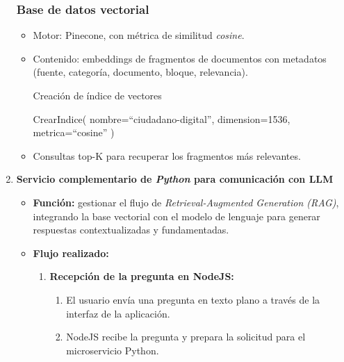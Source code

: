 \begin{enumerate}
            \subsubsection{Base de datos vectorial}
            \begin{itemize}
                  \item Motor: Pinecone, con métrica de similitud \textit{cosine}.
                  \item Contenido: embeddings de fragmentos de documentos con metadatos (fuente,
                        categoría, documento, bloque, relevancia).
                        \begin{algorithm}[H]
                              \caption{Creación de índice de vectores}
                              \label{alg:crear-indice}
                              \begin{algorithmic}[1]
                                    \State CrearIndice(
                                    \Statex \quad nombre=``ciudadano-digital'',
                                    \Statex \quad dimension=1536,
                                    \Statex \quad metrica=``cosine''
                                    \Statex )
                                    \EndProcedure
                              \end{algorithmic}
                        \end{algorithm}
                  \item Consultas top-K para recuperar los fragmentos más relevantes.
            \end{itemize}

      \item \textbf{Servicio complementario de \textit{Python} para comunicación con LLM}
            \begin{itemize}
                  \item \textbf{Función:} gestionar el flujo de \textit{Retrieval-Augmented Generation (RAG)}, integrando la base vectorial con el modelo de lenguaje para generar respuestas contextualizadas y fundamentadas.
                  \item \textbf{Flujo realizado:}
                        \begin{enumerate}
                              \item \textbf{Recepción de la pregunta en NodeJS:}
                                    \begin{enumerate}
                                          \item El usuario envía una pregunta en texto plano a través de la interfaz de la
                                                aplicación.
                                          \item NodeJS recibe la pregunta y prepara la solicitud para el microservicio Python.
                                    \end{enumerate}


\end{enumerate}
\end{itemize}
\end{enumerate}
